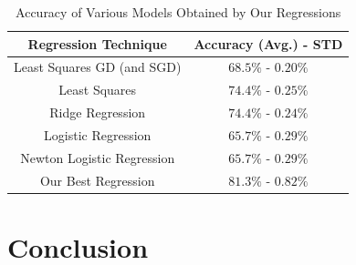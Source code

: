 \documentclass[10pt,conference,compsocconf]{IEEEtran}
\begin{document}
\begin{table}[h]
	\begin{tabular}{ |c|c| } 
		\hline
		\textbf{Regression Technique} & \textbf{Accuracy (Avg.) - STD}  \\
		\hline
		Least Squares GD (and SGD) & $68.5\%$ - $0.20\%$ \\ 
		Least Squares & $74.4\%$ - $0.25\%$ \\ 
		Ridge Regression & $74.4\%$ - $0.24\%$ \\ 
		Logistic Regression & $65.7\%$ - $0.29\%$ \\ 
		Newton Logistic Regression & $65.7\%$ - $0.29\%$ \\ 
		Our Best Regression & $81.3\%$ - $0.82\%$ \\ 
		\hline
	\end{tabular}
	\captionsetup{aboveskip=0.3cm,justification=centering, margin=0.1cm, labelfont=footnotesize, textfont=footnotesize}
	\caption{Accuracy of Various Models Obtained by Our Regressions}
	\label{tab:model_accuracy}
\end{table}

\section{Conclusion}
\label{sec:conclusion}
\end{document}
